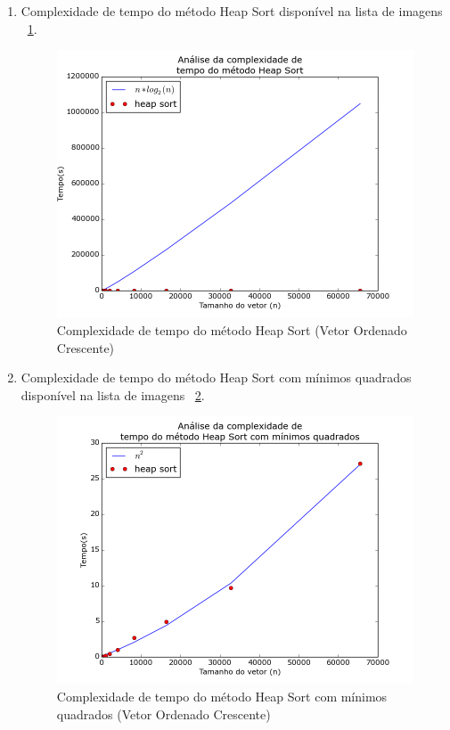 \documentclass[12pt,a4paper,twoside]{report}
\begin{document}
\begin{enumerate}
\begin{enumerate}
			
			\item Complexidade de tempo do método Heap Sort disponível na lista de imagens ~\ref{fig:HeapPlot2OC}.
			\begin{figure}[!h]
				\centering
				\includegraphics[scale=0.6]{../imagens/Heap/heap_plot_2_ordenado_crescente.png}
				\caption{Complexidade de tempo do método Heap Sort (Vetor Ordenado Crescente) \label{fig:HeapPlot2OC}}
			\end{figure}
			
			
			\item Complexidade de tempo do método Heap Sort com mínimos quadrados disponível na lista de imagens ~\ref{fig:HeapPlot3OC}.
			\begin{figure}[!h]
				\centering
				\includegraphics[scale=0.6]{../imagens/Heap/heap_plot_3_ordenado_crescente.png}
				\caption{Complexidade de tempo do método Heap Sort com mínimos quadrados (Vetor Ordenado Crescente) \label{fig:HeapPlot3OC}}
			\end{figure}
		

\end{enumerate}
\end{enumerate}
\end{document}
